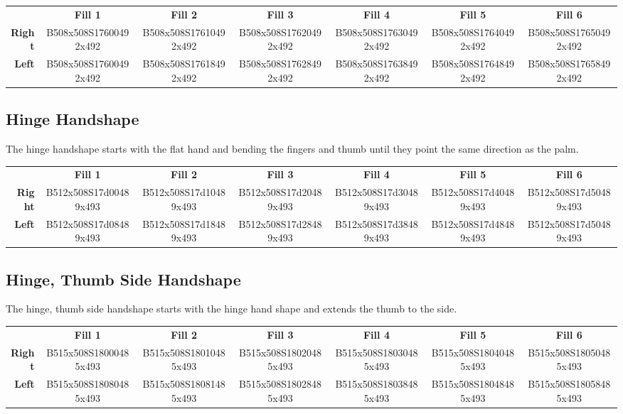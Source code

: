 \documentclass{article}
\begin{document}
\begin{center}
\begin{tabular}{r*{6}{c}}
&\textbf{Fill 1}&\textbf{Fill 2}&\textbf{Fill 3}&\textbf{Fill 4}&\textbf{Fill 5}&\textbf{Fill 6}\\
\textbf{Right}&
B508x508S17600492x492&
B508x508S17610492x492&
B508x508S17620492x492&
B508x508S17630492x492&
B508x508S17640492x492&
B508x508S17650492x492\\
\textbf{Left}&
B508x508S17600492x492&
B508x508S17618492x492&
B508x508S17628492x492&
B508x508S17638492x492&
B508x508S17648492x492&
B508x508S17658492x492\\
\end{tabular}
\end{center}

\subsection{Hinge Handshape}

The hinge handshape starts with the flat hand and bending the fingers and thumb until they point the same direction as the palm.

\begin{center}
\begin{tabular}{r*{6}{c}}
&\textbf{Fill 1}&\textbf{Fill 2}&\textbf{Fill 3}&\textbf{Fill 4}&\textbf{Fill 5}&\textbf{Fill 6}\\
\textbf{Right}&
B512x508S17d00489x493&
B512x508S17d10489x493&
B512x508S17d20489x493&
B512x508S17d30489x493&
B512x508S17d40489x493&
B512x508S17d50489x493\\
\textbf{Left}&
B512x508S17d08489x493&
B512x508S17d18489x493&
B512x508S17d28489x493&
B512x508S17d38489x493&
B512x508S17d48489x493&
B512x508S17d50489x493\\
\end{tabular}
\end{center}

\subsection{Hinge, Thumb Side Handshape}

The hinge, thumb side handshape starts with the hinge hand shape and extends the thumb to the side.

\begin{center}
\begin{tabular}{r*{6}{c}}
&\textbf{Fill 1}&\textbf{Fill 2}&\textbf{Fill 3}&\textbf{Fill 4}&\textbf{Fill 5}&\textbf{Fill 6}\\
\textbf{Right}&
B515x508S18000485x493&
B515x508S18010485x493&
B515x508S18020485x493&
B515x508S18030485x493&
B515x508S18040485x493&
B515x508S18050485x493\\
\textbf{Left}&
B515x508S18080485x493&
B515x508S18081485x493&
B515x508S18028485x493&
B515x508S18038485x493&
B515x508S18048485x493&
B515x508S18058485x493\\
\end{tabular}
\end{center}
\end{document}
